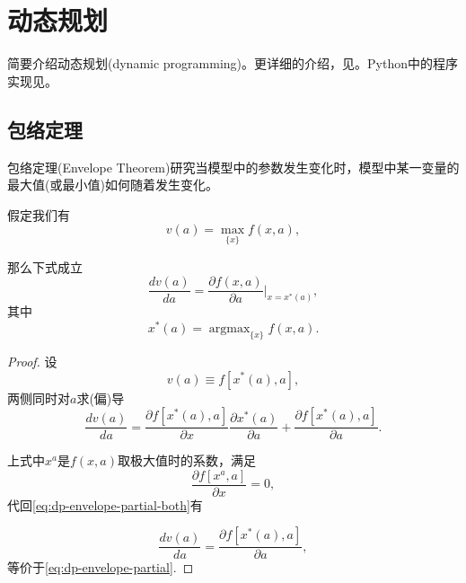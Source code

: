 \chapter{动态规划}
\label{sec:dp}

简要介绍动态规划(dynamic programming)。更详细的介绍，见\cite{Adda:2003tt}。Python中的程序实现见\cite{Stachurski:2008wc}。

\section{包络定理}
\label{sec:dp-envelope-theorem}
包络定理(Envelope Theorem)研究当模型中的参数发生变化时，模型中某一变量的最大值(或最小值)如何随着发生变化。
\begin{theorem}[包络定理]
  \label{theorem:envelope-theorem}
  假定我们有
  \begin{equation}
  \label{eq:dp-envelope-value-def}
  v(a)= \max_{\{x\}} f(x,a),
\end{equation}

那么下式成立
\begin{equation}
  \label{eq:dp-envelope-partial}
  \frac{d v(a)}{d a} = \frac{\partial f(x,a)}{\partial a} \Big|_{x = x^{*}(a)},
\end{equation}
其中
\begin{equation}
  \label{eq:dp-envelope-def-xstar}
  x^{*}(a) = \mathop{\arg \max}_{\{x\}} f(x,a).
\end{equation}
\end{theorem}

\begin{proof}
设
\begin{equation*}
  v(a) \equiv f \left[ x^{*}(a), a \right],
\end{equation*}
两侧同时对$a$求(偏)导
\begin{equation}
  \label{eq:dp-envelope-partial-both}
  \frac{d v(a)}{d a}
  = \frac{\partial f \left[ x^{*}(a), a \right] }
  {\partial x}
  \frac{\partial x^{*}(a)}
  {\partial a}
  + \frac{\partial f \left[ x^{*}(a), a \right] }
  {\partial a}.
\end{equation}

上式中$x^{a}$是$f(x,a)$取极大值时的系数，满足
\begin{equation*}
  \frac{\partial f \left[ x^{a}, a \right]}{\partial x}=0,
\end{equation*}
代回\eqref{eq:dp-envelope-partial-both}有

\begin{equation}
  \label{eq:dp-envelope-partial-both-2}
  \frac{d v(a)}{d a}
  = \frac{\partial f \left[ x^{*}(a), a \right] }
  {\partial a},
\end{equation}
等价于\eqref{eq:dp-envelope-partial}.
\end{proof}

